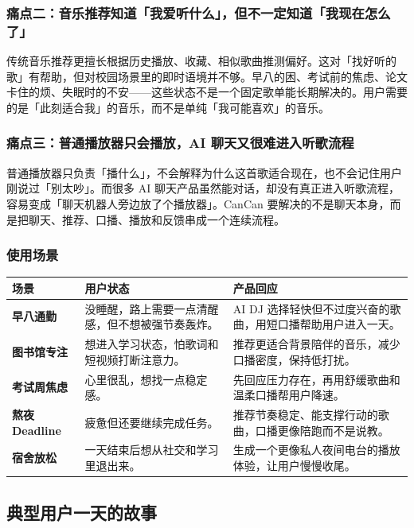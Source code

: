 \documentclass[UTF8,a4paper,11pt,fontset=windows]{ctexart}
\begin{document}
\subsubsection{痛点二：音乐推荐知道「我爱听什么」，但不一定知道「我现在怎么了」}

传统音乐推荐更擅长根据历史播放、收藏、相似歌曲推测偏好。这对「找好听的歌」有帮助，但对校园场景里的即时语境并不够。早八的困、考试前的焦虑、论文卡住的烦、失眠时的不安——这些状态不是一个固定歌单能长期解决的。用户需要的是「此刻适合我」的音乐，而不是单纯「我可能喜欢」的音乐。

\subsubsection{痛点三：普通播放器只会播放，AI 聊天又很难进入听歌流程}

普通播放器只负责「播什么」，不会解释为什么这首歌适合现在，也不会记住用户刚说过「别太吵」。而很多 AI 聊天产品虽然能对话，却没有真正进入听歌流程，容易变成「聊天机器人旁边放了个播放器」。CanCan 要解决的不是聊天本身，而是把聊天、推荐、口播、播放和反馈串成一个连续流程。

\subsubsection{使用场景}

\begin{longtable}{>{\bfseries}p{2.8cm}p{5.4cm}p{6.4cm}}
\toprule
场景 & 用户状态 & 产品回应 \\
\midrule
早八通勤 & 没睡醒，路上需要一点清醒感，但不想被强节奏轰炸。 & AI DJ 选择轻快但不过度兴奋的歌曲，用短口播帮助用户进入一天。 \\
图书馆专注 & 想进入学习状态，怕歌词和短视频打断注意力。 & 推荐更适合背景陪伴的音乐，减少口播密度，保持低打扰。 \\
考试周焦虑 & 心里很乱，想找一点稳定感。 & 先回应压力存在，再用舒缓歌曲和温柔口播帮用户降速。 \\
熬夜 Deadline & 疲惫但还要继续完成任务。 & 推荐节奏稳定、能支撑行动的歌曲，口播更像陪跑而不是说教。 \\
宿舍放松 & 一天结束后想从社交和学习里退出来。 & 生成一个更像私人夜间电台的播放体验，让用户慢慢收尾。 \\
\bottomrule
\end{longtable}

\subsection{典型用户一天的故事}
\end{document}
